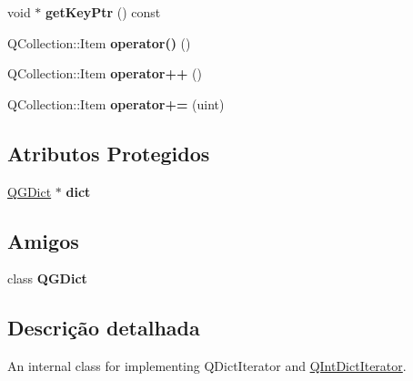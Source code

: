 \begin{DoxyCompactItemize}
\item 
\hypertarget{class_q_g_dict_iterator_a3ca20d9ec5ef6af55f61eb8a979a2934}{void $\ast$ {\bfseries get\-Key\-Ptr} () const }\label{class_q_g_dict_iterator_a3ca20d9ec5ef6af55f61eb8a979a2934}

\item 
\hypertarget{class_q_g_dict_iterator_a3c310601389fba98670bb37b669ee0f6}{Q\-Collection\-::\-Item {\bfseries operator()} ()}\label{class_q_g_dict_iterator_a3c310601389fba98670bb37b669ee0f6}

\item 
\hypertarget{class_q_g_dict_iterator_a420deca6e5875419f8da2e9febec24f9}{Q\-Collection\-::\-Item {\bfseries operator++} ()}\label{class_q_g_dict_iterator_a420deca6e5875419f8da2e9febec24f9}

\item 
\hypertarget{class_q_g_dict_iterator_a869cdd7580cace997c32752f254bb4c3}{Q\-Collection\-::\-Item {\bfseries operator+=} (uint)}\label{class_q_g_dict_iterator_a869cdd7580cace997c32752f254bb4c3}

\end{DoxyCompactItemize}
\subsection*{Atributos Protegidos}
\begin{DoxyCompactItemize}
\item 
\hypertarget{class_q_g_dict_iterator_a7970980d598be19a4a05700929b66bc5}{\hyperlink{class_q_g_dict}{Q\-G\-Dict} $\ast$ {\bfseries dict}}\label{class_q_g_dict_iterator_a7970980d598be19a4a05700929b66bc5}

\end{DoxyCompactItemize}
\subsection*{Amigos}
\begin{DoxyCompactItemize}
\item 
\hypertarget{class_q_g_dict_iterator_a97b03fadfd4d68d39a3a5e5aa0e69111}{class {\bfseries Q\-G\-Dict}}\label{class_q_g_dict_iterator_a97b03fadfd4d68d39a3a5e5aa0e69111}

\end{DoxyCompactItemize}


\subsection{Descrição detalhada}
An internal class for implementing Q\-Dict\-Iterator and \hyperlink{class_q_int_dict_iterator}{Q\-Int\-Dict\-Iterator}. 

